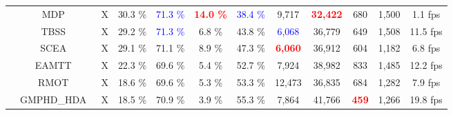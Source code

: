 \documentclass[journal]{IEEEtran}
\begin{document}
\begin{table*}[t]
\begin{tabular}{|c|c|c|ccccccccc|}
            & \footnotesize{MDP~\cite{mdp}} &  \footnotesize{X}
            & \footnotesize{30.3 \%} &  \footnotesize{\textcolor{blue}{71.3 \%}} &  \footnotesize{\textbf{\textcolor{red}{14.0 \%}}} &  \footnotesize{\textcolor{blue}{38.4 \%}} &  \footnotesize{9,717} &  \footnotesize{\textbf{\textcolor{red}{32,422}}} &  \footnotesize{680} &  \footnotesize{1,500} &  \footnotesize{1.1 fps}  \\
            
           &\footnotesize{TBSS~\cite{tbss}} &  \footnotesize{X}
           & \footnotesize{29.2 \%} &  \footnotesize{\textcolor{blue}{71.3 \%}} &  \footnotesize{6.8 \%} &  \footnotesize{43.8 \%} &  \footnotesize{\textcolor{blue}{6,068}} &  \footnotesize{36,779} &  \footnotesize{649} &  \footnotesize{1,508} 
            &  \footnotesize{11.5 fps}   \\
            
            &\footnotesize{SCEA~\cite{scea}} &  \footnotesize{X}
            & \footnotesize{29.1 \%} &  \footnotesize{71.1 \%} &  \footnotesize{8.9 \%} &  \footnotesize{47.3 \%} &  \footnotesize{\textbf{\textcolor{red}{6,060}}} &  \footnotesize{36,912} &  \footnotesize{604} &  \footnotesize{1,182}
            &  \footnotesize{6.8 fps}   \\
         
            & \footnotesize{EAMTT~\cite{eamtt}} &  \footnotesize{X}
            & \footnotesize{22.3 \%} &  \footnotesize{69.6 \%} 
            &  \footnotesize{5.4 \%} &  \footnotesize{52.7 \%} &  \footnotesize{7,924} &  \footnotesize{38,982} &  \footnotesize{833} &  \footnotesize{1,485} 
            & \footnotesize{12.2 fps}   \\
         
            & \footnotesize{RMOT~\cite{rmot}} &  \footnotesize{X}
            & \footnotesize{18.6 \%} &  \footnotesize{69.6 \%} 
            &  \footnotesize{5.3 \%} &  \footnotesize{53.3 \%} &  \footnotesize{12,473} &  \footnotesize{36,835} &  \footnotesize{684} &  \footnotesize{1,282} 
            & \footnotesize{7.9 fps}   \\
           
           & \footnotesize{GMPHD\_HDA~\cite{prev1}} &  \footnotesize{X}
           & \footnotesize{18.5 \%} &  \footnotesize{70.9 \%} &  \footnotesize{3.9 \%} &  \footnotesize{55.3 \%} &  \footnotesize{7,864} &  \footnotesize{41,766} &  \footnotesize{\textbf{\textcolor{red}{459}}} &  \footnotesize{1,266} &  \footnotesize{19.8 fps}   \\
           

\end{tabular}
\end{table*}
\end{document}
